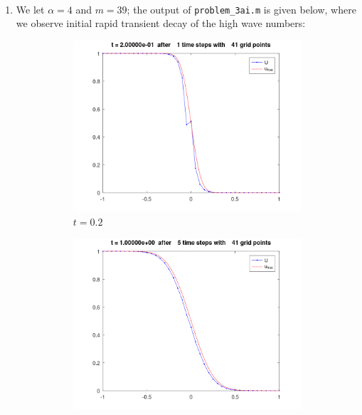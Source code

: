 \begin{solution}\ \\
    \begin{enumerate}
        \item We let $\alpha = 4$ and $m = 39$; the output of \texttt{problem\_3ai.m} is given below, where we observe
              initial rapid transient decay of the high wave numbers:

              \begin{figure}[h]
                  \centering
                  \begin{subfigure}[b]{0.4\textwidth}
                      \centering
                      \includegraphics[width=\textwidth]{problem_3ai_heatCN_t-1.png}
                      \caption{$t = 0.2$}
                  \end{subfigure}
                  \hfill
                  \begin{subfigure}[b]{0.4\textwidth}
                      \centering
                      \includegraphics[width=\textwidth]{problem_3ai_heatCN_t-5.png}

\end{subfigure}
\end{figure}
\end{enumerate}
\end{solution}

